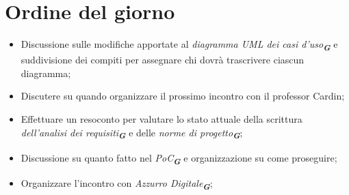 

\section{Ordine del giorno}

\begin{itemize}
    \item Discussione sulle modifiche apportate al \emph{diagramma UML dei casi d'uso}\textsubscript{\textit{\textbf{G}}} e suddivisione dei compiti per assegnare chi dovrà trascrivere ciascun diagramma;   
    \item Discutere su quando organizzare il prossimo incontro con il professor Cardin;
    \item Effettuare un resoconto per valutare lo stato attuale della scrittura \emph{dell'analisi dei requisiti}\textsubscript{\textit{\textbf{G}}} e delle \emph{norme di progetto}\textsubscript{\textit{\textbf{G}}};
    \item Discussione su quanto fatto nel \emph{PoC}\textsubscript{\textit{\textbf{G}}} e organizzazione su come proseguire;
    \item Organizzare l'incontro con \emph{Azzurro Digitale}\textsubscript{\textit{\textbf{G}}};
\end{itemize}
